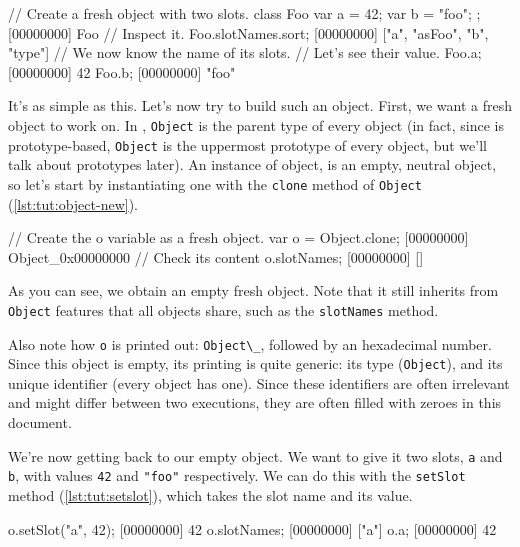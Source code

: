 \begin{urbiscript}[caption=Inspecting an \us object,label=lst:tut:object-slots]
// Create a fresh object with two slots.
class Foo { var a = 42; var b = "foo"; };
[00000000] Foo
// Inspect it.
Foo.slotNames.sort;
[00000000] ["a", "asFoo", "b", "type"]
// We now know the name of its slots.
// Let's see their value.
Foo.a;
[00000000] 42
Foo.b;
[00000000] "foo"
\end{urbiscript}

It's as simple as this. Let's now try to build such an object. First,
we want a fresh object to work on. In \us, \lstinline{Object} is the
parent type of every object (in fact, since \us is prototype-based,
\lstinline{Object} is the uppermost prototype of every object, but
we'll talk about prototypes later). An instance of object, is an
empty, neutral object, so let's start by instantiating one with the
\lstinline{clone} method of \lstinline{Object}
(\autoref{lst:tut:object-new}).

\begin{urbiscript}[caption=Instanciating a new object,
  label=lst:tut:object-new, name=object-slots]
// Create the o variable as a fresh object.
var o = Object.clone;
[00000000] Object_0x00000000
// Check its content
o.slotNames;
[00000000] []
\end{urbiscript}

As you can see, we obtain an empty fresh object. Note that it still
inherits from \lstinline{Object} features that all objects share, such as
the \lstinline{slotNames} method.

Also note how \lstinline{o} is printed out: \lstinline{Object\_}, followed by an
hexadecimal number. Since this object is empty, its printing is quite
generic: its type (\lstinline{Object}), and its unique identifier (every
\us object has one). Since these identifiers are often irrelevant
and might differ between two executions, they are often filled with
zeroes in this document.

We're now getting back to our empty object. We want to give it two
slots, \lstinline{a} and \lstinline{b}, with values \lstinline|42| and
\lstinline|"foo"| respectively. We can do this with the
\lstinline{setSlot} method (\autoref{lst:tut:setslot}), which takes the slot name and
its value.

\begin{urbiscript}[caption=Defining slots, label=lst:tut:setslot,
  name=object-slots]
o.setSlot("a", 42);
[00000000] 42
o.slotNames;
[00000000] ["a"]
o.a;
[00000000] 42
\end{urbiscript}

